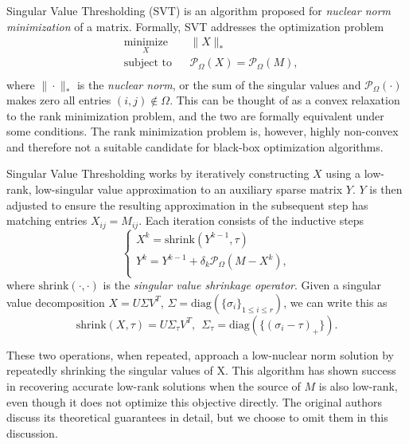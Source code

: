 \documentclass{article} %
\begin{document}
Singular Value Thresholding (SVT) \cite{cai2010singular} is an
algorithm proposed for \emph{nuclear norm minimization} of a matrix.
Formally, SVT addresses the optimization problem
\begin{equation*}
\begin{aligned}
  & \underset{X}{\text{minimize}} & & \|X\|_{*} \\
  & \text{subject to}             & & \mathcal{P}_\Omega (X) =
  \mathcal{P}_\Omega (M), \\
\end{aligned}
\end{equation*}
where $\|\cdot\|_{*}$ is the \emph{nuclear norm}, or the sum of the
singular values and $\mathcal{P}_\Omega (\cdot)$ makes zero all
entries $(i, j) \notin \Omega$. This can be thought of as a convex
relaxation to the rank minimization problem, and the two are formally
equivalent under some conditions. The rank minimization problem is,
however, highly non-convex and therefore not a suitable candidate for
black-box optimization algorithms.

Singular Value Thresholding works by iteratively constructing $X$
using a low-rank, low-singular value approximation to an auxiliary
sparse matrix $Y$. $Y$ is then adjusted to ensure the resulting
approximation in the subsequent step has matching entries
$X_{ij} = M_{ij}$. Each iteration consists of the inductive steps
\begin{equation*}
\begin{cases}
X^{k} = \mathrm{shrink}(Y^{k-1}, \tau) \\
Y^{k} = Y^{k-1} + \delta_k \mathcal{P}_\Omega (M-X^{k}),              \\
\end{cases}
\end{equation*}
where $\mathrm{shrink}(\cdot, \cdot)$ is the \emph{singular value
  shrinkage operator}. Given a singular value decomposition $X = U
\Sigma V^T$, $\Sigma = \mathrm{diag}(\{\sigma_i\}_{1 \le i \le r})$, we
  can write this as
\begin{equation*}
\mathrm{shrink}(X, \tau) = U\Sigma_\tau V^T, \ \ \Sigma_\tau = \mathrm{diag}(\{(\sigma_i-\tau)_{+}\}).
\end{equation*} 


These two operations, when repeated, approach a low-nuclear norm
solution by repeatedly shrinking the singular values of X. This
algorithm has shown success in recovering accurate low-rank solutions
when the source of $M$ is also low-rank, even though it does not
optimize this objective directly. The original authors discuss its
theoretical guarantees in detail, but we choose to omit them in this
discussion.
\end{document}
